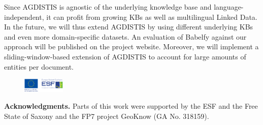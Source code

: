 \documentclass{llncs}
\begin{document}
Since AGDISTIS is agnostic of the underlying knowledge base and language-independent, it can profit from growing KBs as well as multilingual Linked Data.
In the future, we will thus extend AGDISTIS by using different underlying KBs and even more domain-specific datasets.
An evaluation of Babelfy against our approach will be published on the project website.
Moreover, we will implement a sliding-window-based extension of AGDISTIS to account for large amounts of entities per document.
%

\begin{figure}
 \vspace{-8mm}
 \includegraphics[width=0.18\textwidth]{esf.pdf}
\end{figure}
\textbf{Acknowledgments.} Parts of this work were supported by the ESF and the Free State of Saxony and the FP7 project GeoKnow (GA No. 318159).




\end{document}
